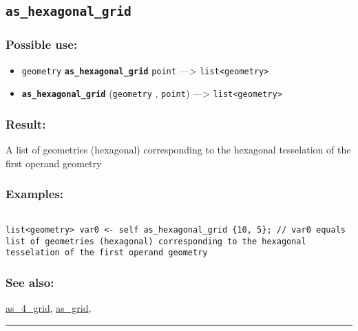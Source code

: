 \documentclass[]{book}
\providecommand{\tightlist}{%
  \setlength{\itemsep}{0pt}\setlength{\parskip}{0pt}}
\theoremstyle{definition}
\theoremstyle{definition}
\theoremstyle{definition}
\theoremstyle{remark}
\begin{document}
\subsection{\texorpdfstring{\texttt{as\_hexagonal\_grid}}{as\_hexagonal\_grid}}\label{as_hexagonal_grid}

\subsubsection{Possible use:}\label{possible-use-49}

\begin{itemize}
\tightlist
\item
  \texttt{geometry} \textbf{\texttt{as\_hexagonal\_grid}} \texttt{point}
  ---\textgreater{} \texttt{list\textless{}geometry\textgreater{}}
\item
  \textbf{\texttt{as\_hexagonal\_grid}} (\texttt{geometry} ,
  \texttt{point}) ---\textgreater{}
  \texttt{list\textless{}geometry\textgreater{}}
\end{itemize}

\subsubsection{Result:}\label{result-48}

A list of geometries (hexagonal) corresponding to the hexagonal
tesselation of the first operand geometry

\subsubsection{Examples:}\label{examples-40}

\begin{verbatim}
 
list<geometry> var0 <- self as_hexagonal_grid {10, 5}; // var0 equals list of geometries (hexagonal) corresponding to the hexagonal tesselation of the first operand geometry
\end{verbatim}

\subsubsection{See also:}\label{see-also-34}

\href{operators-a-to-a.html\#as_4_grid}{as\_4\_grid},
\href{operators-a-to-a.html\#as_grid}{as\_grid},

\begin{center}\rule{0.5\linewidth}{\linethickness}\end{center}
\end{document}
